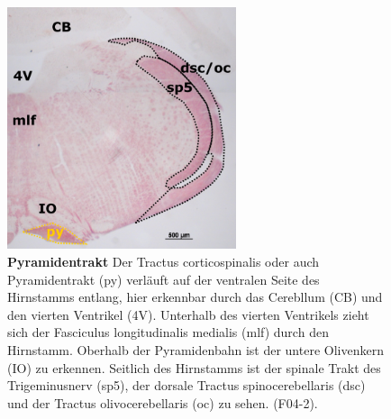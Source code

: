 \documentclass[12pt,a4paper,pdftex]{article}
\begin{document}
\begin{figure}[H]
    \centering
    \includegraphics[width=0.6\textwidth]{pictures/Bilder_Laura/py_F04_2P_025x.png}
    \caption[Pyramidentrakt]{\textbf{Pyramidentrakt} Der Tractus corticospinalis oder auch Pyramidentrakt (py) verläuft auf der ventralen Seite des Hirnstamms entlang, hier erkennbar durch das Cerebllum (CB) und den vierten Ventrikel (4V). Unterhalb des vierten Ventrikels zieht sich der Fasciculus longitudinalis medialis (mlf) durch den Hirnstamm. Oberhalb der Pyramidenbahn ist der untere Olivenkern (IO) zu erkennen. Seitlich des Hirnstamms ist der spinale Trakt des Trigeminusnerv (sp5), der dorsale Tractus spinocerebellaris (dsc) und der Tractus olivocerebellaris (oc) zu sehen. (F04-2).}
    \label{fig:pyramidentrakt}
\end{figure}
\end{document}
